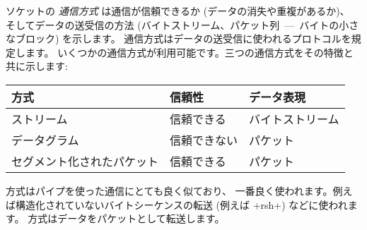 ソケットの \emph{通信方式} は通信が信頼できるか (データの消失や重複があるか)、
そしてデータの送受信の方法 (バイトストリーム、パケット列~---~バイトの小さなブロック) を示します。
通信方式はデータの送受信に使われるプロトコルを規定します。
いくつかの通信方式が利用可能です。三つの通信方式をその特徴と共に示します:
%
\begin{center}
\begin{tabular}{lll}
  方式 & 信頼性 & データ表現 \\
  \hline
  ストリーム & 信頼できる & バイトストリーム \\
  データグラム & 信頼できない & パケット \\
  セグメント化されたパケット & 信頼できる & パケット \\
\hline
\end{tabular}
\end{center}
%
 方式はパイプを使った通信にとても良く似ており、
一番良く使われます。例えば構造化されていないバイトシーケンスの転送 (例えば \ml+rsh+) などに使われます。
 方式はデータをパケットとして転送します。
